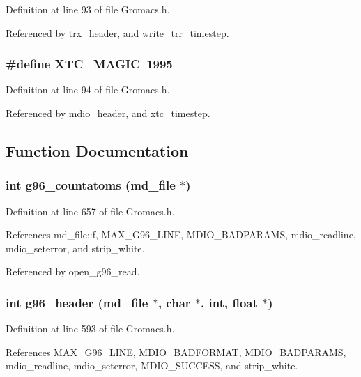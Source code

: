 Definition at line 93 of file Gromacs.h.

Referenced by trx\_\-header, and write\_\-trr\_\-timestep.
\subsubsection{\setlength{\rightskip}{0pt plus 5cm}\#define XTC\_\-MAGIC\ 1995}\label{Gromacs_8h_a19}




Definition at line 94 of file Gromacs.h.

Referenced by mdio\_\-header, and xtc\_\-timestep.

\subsection{Function Documentation}
\subsubsection{\setlength{\rightskip}{0pt plus 5cm}int g96\_\-countatoms ({\bf md\_\-file} $\ast$)\hspace{0.3cm}{\tt  [static]}}\label{Gromacs_8h_a52}




Definition at line 657 of file Gromacs.h.

References md\_\-file::f, MAX\_\-G96\_\-LINE, MDIO\_\-BADPARAMS, mdio\_\-readline, mdio\_\-seterror, and strip\_\-white.

Referenced by open\_\-g96\_\-read.
\subsubsection{\setlength{\rightskip}{0pt plus 5cm}int g96\_\-header ({\bf md\_\-file} $\ast$, char $\ast$, int, float $\ast$)\hspace{0.3cm}{\tt  [static]}}\label{Gromacs_8h_a49}




Definition at line 593 of file Gromacs.h.

References MAX\_\-G96\_\-LINE, MDIO\_\-BADFORMAT, MDIO\_\-BADPARAMS, mdio\_\-readline, mdio\_\-seterror, MDIO\_\-SUCCESS, and strip\_\-white.

